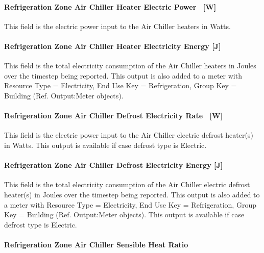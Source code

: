 \paragraph{Refrigeration Zone Air Chiller Heater Electric Power~ {[}W{]}}\label{refrigeration-zone-air-chiller-heater-electric-power-w}

This field is the electric power input to the Air Chiller heaters in Watts.

\paragraph{Refrigeration Zone Air Chiller Heater Electricity Energy {[}J{]}}\label{refrigeration-zone-air-chiller-heater-electric-energy-j}

This field is the total electricity consumption of the Air Chiller heaters in Joules over the timestep being reported. This output is also added to a meter with Resource Type = Electricity, End Use Key = Refrigeration, Group Key = Building (Ref. Output:Meter objects).

\paragraph{Refrigeration Zone Air Chiller Defrost Electricity Rate~ {[}W{]}}\label{refrigeration-zone-air-chiller-defrost-electric-power-w}

This field is the electric power input to the Air Chiller electric defrost heater(s) in Watts. This output is available if case defrost type is Electric.

\paragraph{Refrigeration Zone Air Chiller Defrost Electricity Energy {[}J{]}}\label{refrigeration-zone-air-chiller-defrost-electric-energy-j}

This field is the total electricity consumption of the Air Chiller electric defrost heater(s) in Joules over the timestep being reported. This output is also added to a meter with Resource Type = Electricity, End Use Key = Refrigeration, Group Key = Building (Ref. Output:Meter objects). This output is available if case defrost type is Electric.

\paragraph{Refrigeration Zone Air Chiller Sensible Heat Ratio}\label{refrigeration-zone-air-chiller-sensible-heat-ratio}

